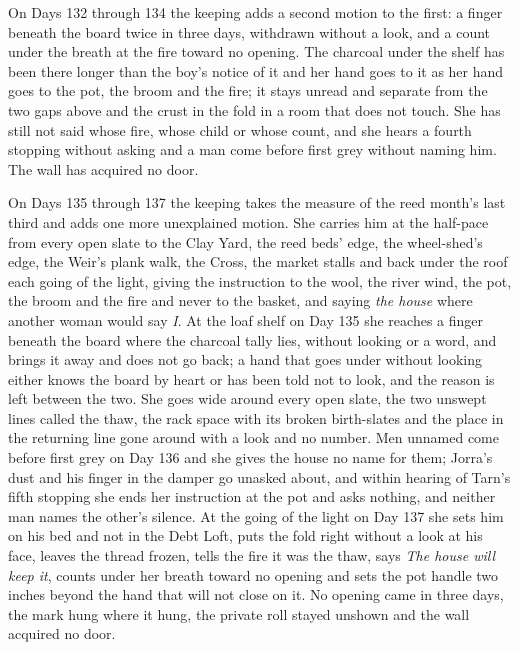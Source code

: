 \documentclass{design/chronicle}
\begin{document}
{On Days 132 through 134 the keeping adds a second motion to the first: a finger beneath the board twice in three days, withdrawn without a look, and a count under the breath at the fire toward no opening. The charcoal under the shelf has been there longer than the boy’s notice of it and her hand goes to it as her hand goes to the pot, the broom and the fire; it stays unread and separate from the two gaps above and the crust in the fold in a room that does not touch. She has still not said whose fire, whose child or whose count, and she hears a fourth stopping without asking and a man come before first grey without naming him. The wall has acquired no door.

On Days 135 through 137 the keeping takes the measure of the reed month’s last third and adds one more unexplained motion. She carries him at the half-pace from every open slate to the Clay Yard, the reed beds’ edge, the wheel-shed’s edge, the Weir’s plank walk, the Cross, the market stalls and back under the roof each going of the light, giving the instruction to the wool, the river wind, the pot, the broom and the fire and never to the basket, and saying \emph{the house} where another woman would say \emph{I}. At the loaf shelf on Day 135 she reaches a finger beneath the board where the charcoal tally lies, without looking or a word, and brings it away and does not go back; a hand that goes under without looking either knows the board by heart or has been told not to look, and the reason is left between the two. She goes wide around every open slate, the two unswept lines called the thaw, the rack space with its broken birth-slates and the place in the returning line gone around with a look and no number. Men unnamed come before first grey on Day 136 and she gives the house no name for them; Jorra’s dust and his finger in the damper go unasked about, and within hearing of Tarn’s fifth stopping she ends her instruction at the pot and asks nothing, and neither man names the other’s silence. At the going of the light on Day 137 she sets him on his bed and not in the Debt Loft, puts the fold right without a look at his face, leaves the thread frozen, tells the fire it was the thaw, says \emph{The house will keep it}, counts under her breath toward no opening and sets the pot handle two inches beyond the hand that will not close on it. No opening came in three days, the mark hung where it hung, the private roll stayed unshown and the wall acquired no door.

}
\end{document}
